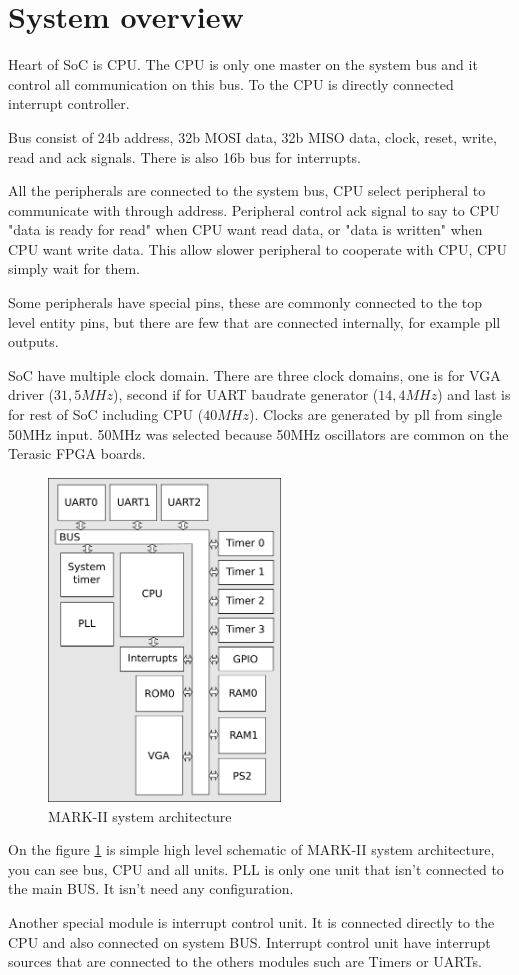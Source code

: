 \section{System overview}

Heart of SoC is CPU. The CPU is only one master on the system bus and it control
all communication on this bus. To the CPU is directly connected interrupt
controller.

Bus consist of 24b address, 32b MOSI data, 32b MISO data, clock, reset, write,
read and ack signals. There is also 16b bus for interrupts.

All the peripherals are connected to the system bus, CPU select peripheral to
communicate with through address. Peripheral control ack signal to say to CPU
"data is ready for read" when CPU want read data, or "data is written" when CPU
want write data. This allow slower peripheral to cooperate with CPU, CPU simply
wait for them.

Some peripherals have special pins, these are commonly connected to the top
level entity pins, but there are few that are connected internally, for example
pll outputs.

SoC have multiple clock domain. There are three clock domains, one is for VGA
driver ($31,5 MHz$), second if for UART baudrate generator ($14,4 MHz$) and
last is for rest of SoC including CPU ($40 MHz$). Clocks are generated by pll
from single 50MHz input. 50MHz was selected because 50MHz oscillators are
common on the Terasic FPGA boards.

\begin{figure}
    \centering
    \includegraphics[width=0.55\textwidth]{img/MARK_II.png}
    \caption{MARK-II system architecture}
    \label{fig:sysarch}
\end{figure}

On the figure \ref{fig:sysarch} is simple high level schematic of MARK-II
system architecture, you can see bus, CPU and all units. PLL is only one unit
that isn't connected to the main BUS. It isn't need any configuration.

Another special module is interrupt control unit. It is connected directly to
the CPU and also connected on system BUS. Interrupt control unit have interrupt
sources that are connected to the others modules such are Timers or UARTs.
